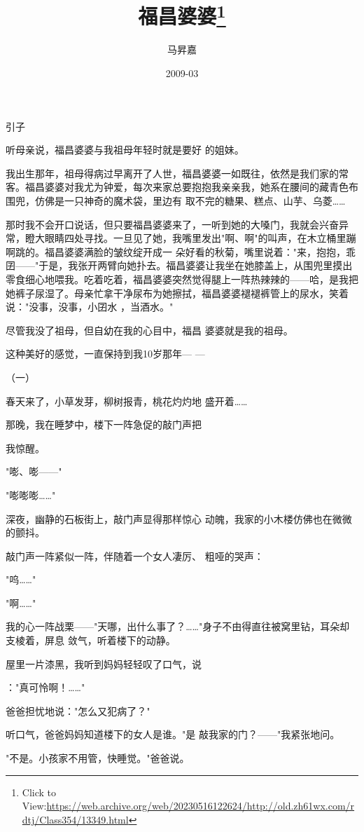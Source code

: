 \documentclass{article}
\title{福昌婆婆\footnote{Click to View:\url{https://web.archive.org/web/20230516122624/http://old.zh61wx.com/rdtj/Class354/13349.html}}}
\author{马昇嘉}
\date{2009-03}
\begin{document}

\maketitle


\Large


﻿引子 

听母亲说，福昌婆婆与我祖母年轻时就是要好
的姐妹。 

我出生那年，祖母得病过早离开了人世，福昌婆婆一如既往，依然是我们家的常客。福昌婆婆对我尤为钟爱，每次来家总要抱抱我亲亲我，她系在腰间的藏青色布围兜，仿佛是一只神奇的魔术袋，里边有
取不完的糖果、糕点、山芋、乌菱…… 

那时我不会开口说话，但只要福昌婆婆来了，一听到她的大嗓门，我就会兴奋异常，瞪大眼睛四处寻找。一旦见了她，我嘴里发出"啊、啊"的叫声，在木立桶里蹦啊跳的。福昌婆婆满脸的皱纹绽开成一
\newpage
朵好看的秋菊，嘴里说着："来，抱抱，乖囝——"于是，我张开两臂向她扑去。福昌婆婆让我坐在她膝盖上，从围兜里摸出零食细心地喂我。吃着吃着，福昌婆婆突然觉得腿上一阵热辣辣的——哈，是我把她裤子尿湿了。母亲忙拿干净尿布为她擦拭，福昌婆婆褪褪裤管上的尿水，笑着说："没事，没事，小囝水
，当酒水。" 

尽管我没了祖母，但自幼在我的心目中，福昌
婆婆就是我的祖母。 

这种美好的感觉，一直保持到我10岁那年—
— 


（一） 

春天来了，小草发芽，柳树报青，桃花灼灼地
盛开着…… 

那晚，我在睡梦中，楼下一阵急促的敲门声把

\newpage
我惊醒。 


"嘭、嘭——" 


"嘭嘭嘭……" 

深夜，幽静的石板街上，敲门声显得那样惊心
动魄，我家的小木楼仿佛也在微微的颤抖。 

敲门声一阵紧似一阵，伴随着一个女人凄厉、
粗哑的哭声： 


"呜……" 


"啊……" 

我的心一阵战栗——"天哪，出什么事了？……"身子不由得直往被窝里钻，耳朵却支棱着，屏息
敛气，听着楼下的动静。 

屋里一片漆黑，我听到妈妈轻轻叹了口气，说

\newpage
："真可怜啊！……" 


爸爸担忧地说："怎么又犯病了？" 

听口气，爸爸妈妈知道楼下的女人是谁。"是
敲我家的门？——"我紧张地问。 

"不是。小孩家不用管，快睡觉。"爸爸说。
 
\end{document}
